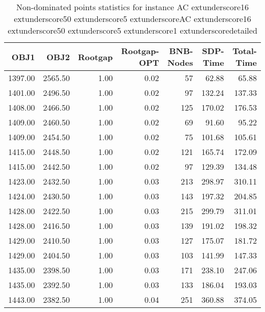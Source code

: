 \begin{table}
\caption{Non-dominated points statistics for instance AC	extunderscore16	extunderscore50	extunderscore5	extunderscoreAC	extunderscore16	extunderscore50	extunderscore5	extunderscore1	extunderscoredetailed}
\label{tab:stats/AC_16_50_5_AC_16_50_5_1_detailed}
\begin{tabular}{rrrrrrr}
\toprule
OBJ1 & OBJ2 & Rootgap & Rootgap-OPT & BNB-Nodes & SDP-Time & Total-Time \\
\midrule
1397.00 & 2565.50 & 1.00 & 0.02 & 57 & 62.88 & 65.88 \\
1401.00 & 2496.50 & 1.00 & 0.02 & 97 & 132.24 & 137.33 \\
1408.00 & 2466.50 & 1.00 & 0.02 & 125 & 170.02 & 176.53 \\
1409.00 & 2460.50 & 1.00 & 0.02 & 69 & 91.60 & 95.22 \\
1409.00 & 2454.50 & 1.00 & 0.02 & 75 & 101.68 & 105.61 \\
1415.00 & 2448.50 & 1.00 & 0.02 & 121 & 165.74 & 172.09 \\
1415.00 & 2442.50 & 1.00 & 0.02 & 97 & 129.39 & 134.48 \\
1423.00 & 2432.50 & 1.00 & 0.03 & 213 & 298.97 & 310.11 \\
1424.00 & 2430.50 & 1.00 & 0.03 & 143 & 197.32 & 204.85 \\
1428.00 & 2422.50 & 1.00 & 0.03 & 215 & 299.79 & 311.01 \\
1428.00 & 2416.50 & 1.00 & 0.03 & 139 & 191.02 & 198.32 \\
1429.00 & 2410.50 & 1.00 & 0.03 & 127 & 175.07 & 181.72 \\
1429.00 & 2404.50 & 1.00 & 0.03 & 103 & 141.99 & 147.33 \\
1435.00 & 2398.50 & 1.00 & 0.03 & 171 & 238.10 & 247.06 \\
1435.00 & 2392.50 & 1.00 & 0.03 & 133 & 186.04 & 193.03 \\
1443.00 & 2382.50 & 1.00 & 0.04 & 251 & 360.88 & 374.05 \\
\bottomrule
\end{tabular}
\end{table}
